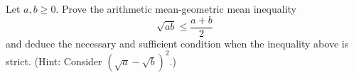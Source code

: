 \begin{exercise}
  \label{ex:hw04:two-variable-am-gm}
  Let $a,b\ge0$. Prove the arithmetic mean-geometric mean inequality
  \[
    \sqrt{ab}\le\frac{a+b}{2}
  \]
  and deduce the necessary and sufficient condition when the inequality
  above is strict. (Hint: Consider $(\sqrt a-\sqrt b)^2$.)
\end{exercise}
